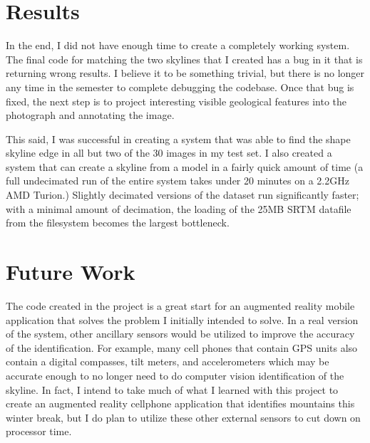 \documentclass{acm_proc_article-sp}
\begin{document}
\section{Results}
    In the end, I did not have enough time to create a completely working system.  The final code for matching the two skylines that I created has a bug in it that is returning wrong results.  I believe it to be something trivial, but there is no longer any time in the semester to complete debugging the codebase.  Once that bug is fixed, the next step is to project interesting visible geological features into the photograph and annotating the image.

    This said, I was successful in creating a system that was able to find the shape skyline edge in all but two of the 30 images in my test set.  I also created a system that can create a skyline from a model in a fairly quick amount of time (a full undecimated run of the entire system takes under 20 minutes on a 2.2GHz AMD Turion.)  Slightly decimated versions of the dataset run significantly faster; with a minimal amount of decimation, the loading of the 25MB SRTM datafile from the filesystem becomes the largest bottleneck.  

\section{Future Work}
    The code created in the project is a great start for an augmented reality mobile application that solves the problem I initially intended to solve.  In a real version of the system, other ancillary sensors would be utilized to improve the accuracy of the identification.  For example, many cell phones that contain GPS units also contain a digital compasses, tilt meters, and accelerometers which may be accurate enough to no longer need to do computer vision identification of the skyline.  In fact, I intend to take much of what I learned with this project to create an augmented reality cellphone application that identifies mountains this winter break, but I do plan to utilize these other external sensors to cut down on processor time.
\end{document}
